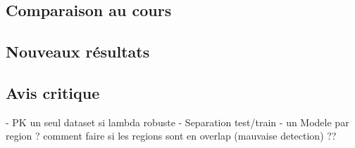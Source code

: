 \documentclass{article}
\begin{document}
\subsection{Comparaison au cours}

\subsection{Nouveaux résultats}


\subsection{Avis critique}
- PK un seul dataset si lambda robuste
- Separation test/train
- un Modele par region ? comment faire si les regions sont en overlap (mauvaise detection) ??





%
\end{document}
